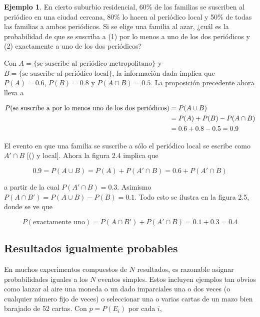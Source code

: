 \documentclass[
  11pt,
]{book}
\theoremstyle{definition}
\theoremstyle{definition}
\newtheorem{example}{Ejemplo}[chapter]
\theoremstyle{definition}
\theoremstyle{definition}
\theoremstyle{remark}
\begin{document}
\begin{example}
En cierto suburbio residencial, 60\% de las familias se suscriben al periódico en una ciudad cercana, 80\% lo hacen al periódico local y 50\% de todas las familias a ambos periódicos. Si se elige una familia al azar, ¿cuál es la probabilidad de que se suscriba a (1) por lo menos a uno de los dos periódicos y (2) exactamente a uno de los dos periódicos?

Con \(A = \{\text{se suscribe al periódico metropolitano}\}\) y \(B = \{\text{se suscribe al periódico local}\}\), la información dada implica que \(P(A) = 0.6\), \(P(B) = 0.8\) y \(P(A \cap B) = 0.5\). La proposición precedente ahora lleva a

\begin{equation}
\notag
\begin{split}
P(\text{se suscribe a por lo menos uno de los dos periódicos}) &= P(A \cup B)\\
&= P(A) + P(B) - P(A \cap B)\\
&= 0.6 + 0.8 - 0.5 = 0.9
\end{split}
\end{equation}

El evento en que una familia se suscribe a sólo el periódico local se escribe como \(A' \cap B\) {[}() y local{]}. Ahora la figura 2.4 implica que

\[
0.9 = P(A \cup B) = P(A) + P(A' \cap B) = 0.6 + P(A' \cap B)
\]

a partir de la cual \(P(A' \cap B) = 0.3\). Asimismo \(P(A \cap B') = P(A \cup B) - P(B) = 0.1\). Todo esto se ilustra en la figura 2.5, donde se ve que

\[
P(\text{exactamente uno}) = P(A \cap B') + P(A' \cap B) = 0.1 + 0.3 = 0.4
\]
\end{example}

\subsection{Resultados igualmente probables}\label{probabilidad-variable-aleatoria-resultados-igualmente-probables}

En muchos experimentos compuestos de \(N\) resultados, es razonable asignar probabilidades iguales a los \(N\) eventos simples. Estos incluyen ejemplos tan obvios como lanzar al aire una moneda o un dado imparciales una o dos veces (o cualquier número fijo de veces) o seleccionar una o varias cartas de un mazo bien barajado de 52 cartas. Con \(p = P(E_{i})\) por cada \(i\),
\end{document}
